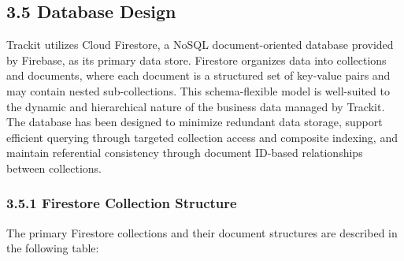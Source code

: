 \documentclass[12pt, oneside]{article}
\begin{document}
\subsection*{3.5 Database Design}

Trackit utilizes Cloud Firestore, a NoSQL document-oriented database provided by Firebase, as its primary data store. Firestore organizes data into collections and documents, where each document is a structured set of key-value pairs and may contain nested sub-collections. This schema-flexible model is well-suited to the dynamic and hierarchical nature of the business data managed by Trackit.\\[0.25cm]
The database has been designed to minimize redundant data storage, support efficient querying through targeted collection access and composite indexing, and maintain referential consistency through document ID-based relationships between collections.

\subsubsection*{3.5.1 Firestore Collection Structure}

The primary Firestore collections and their document structures are described in the following table:
\end{document}
